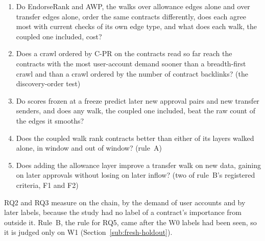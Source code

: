\begin{enumerate}
\item[RQ1.] Do EndorseRank and AWP, the walks over allowance edges alone and over transfer edges alone, order the same contracts differently, does each agree most with current checks of its own edge type, and what does each walk, the coupled one included, cost?
\item[RQ2.] Does a crawl ordered by \mbox{C-PR} on the contracts read so far reach the contracts with the most user-account demand sooner than a breadth-first crawl and than a crawl ordered by the number of contract backlinks? (the discovery-order test)
\item[RQ3.] Do scores frozen at a freeze predict later new approval pairs and new transfer senders, and does any walk, the coupled one included, beat the raw count of the edges it smooths?
\item[RQ4.] Does the coupled walk rank contracts better than either of its layers walked alone, in window and out of window? (rule~A)
\item[RQ5.] Does adding the allowance layer improve a transfer walk on new data, gaining on later approvals without losing on later inflow? (two of rule~B's registered criteria, F1 and F2)
\end{enumerate}

RQ2 and RQ3 measure on the chain, by the demand of user accounts and by later labels, because the study had no label of a contract's importance from outside it. Rule~B, the rule for RQ5, came after the W0 labels had been seen, so it is judged only on W1 (Section~\ref{sub:fresh-holdout}).


